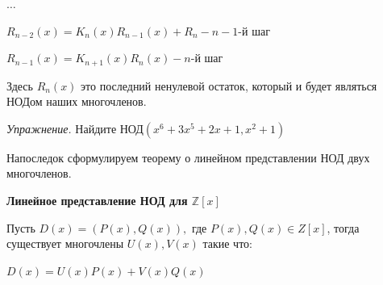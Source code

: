 \centerline{$\dotsc$}

\centerline{$R_{n-2}(x) = K_n(x)R_{n-1}(x) + R_n - n-1$-й шаг}

\centerline{$R_{n-1}(x) = K_{n+1}(x)R_{n}(x) - n$-й шаг}

Здесь $R_n(x)$ это последний ненулевой остаток, который и будет являться НОДом наших многочленов.

\textit{Упражнение.} Найдите НОД$(x^6+3x^5+2x+1, x^2+1)$

\hspace{3mm}

Напоследок сформулируем теорему о линейном представлении НОД двух многочленов.

\textbf{Линейное представление НОД для $\mathbb{Z}[x]$}

Пусть $D(x) = (P(x), Q(x)),$ где $P(x), Q(x) \in Z[x]$, тогда существует многочлены $U(x), V(x)$ такие что: 

$D(x) = U(x)P(x)+V(x)Q(x)$